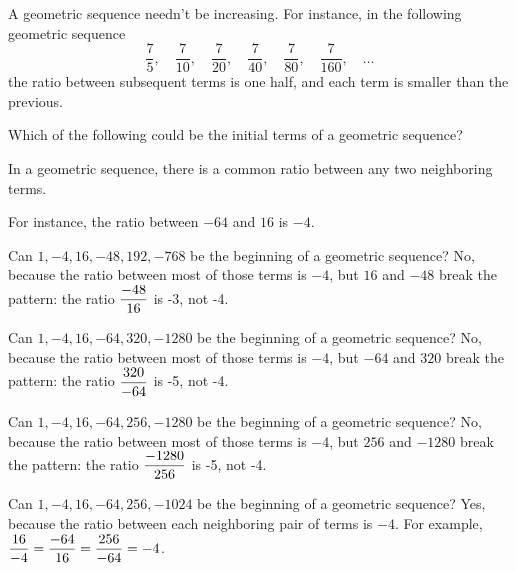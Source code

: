 \documentclass{ximera}
\begin{document}
A geometric sequence needn't be increasing.  For instance, in the following geometric sequence
$$
\frac{7}{5}, \quad \frac{7}{10}, \quad \frac{7}{20}, \quad \frac{7}{40}, \quad \frac{7}{80}, \quad \frac{7}{160}, \quad\ldots
$$
the ratio between subsequent terms is one half, and each term is smaller than the previous.

\begin{question}
  Which of the following could be the initial terms of a geometric sequence?
              
    \begin{hint}
      In a geometric sequence, there is a common ratio between any two neighboring terms.
    \end{hint}
    \begin{hint}
      For instance, the ratio between $-64$ and $16$ is $-4$.
    \end{hint}
    \begin{hint}
      Can $1,  -4,  16,  -48,  192,  -768 $ be the beginning of a geometric sequence?  No, because the ratio between most of those terms is $-4$, but $16$ and $-48$ break the pattern: the ratio $\displaystyle\displaystyle\frac{-48}{16}$ is -3, not -4.
    \end{hint}
    \begin{hint}
      Can $1,  -4,  16,  -64,  320,  -1280 $ be the beginning of a geometric sequence?  No, because the ratio between most of those terms is $-4$, but $-64$ and $320$ break the pattern: the ratio $\displaystyle\displaystyle\frac{320}{-64}$ is -5, not -4.
    \end{hint}
    \begin{hint}
      Can $1,  -4,  16,  -64,  256,  -1280 $ be the beginning of a geometric sequence?  No, because the ratio between most of those terms is $-4$, but $256$ and $-1280$ break the pattern: the ratio $\displaystyle\displaystyle\frac{-1280}{256}$ is -5, not -4.
    \end{hint}
    \begin{hint}
      Can $1,  -4,  16,  -64,  256,  -1024 $ be the beginning of a geometric sequence?  Yes, because the ratio between each neighboring pair of terms is $-4$.  For example, 
      $\displaystyle\displaystyle\frac{16}{-4} = \displaystyle\displaystyle\frac{-64}{16} = \displaystyle\displaystyle\frac{256}{-64} = -4$.
    \end{hint}

    \begin{multipleChoice}
    \end{multipleChoice}


\end{question}
\end{document}
